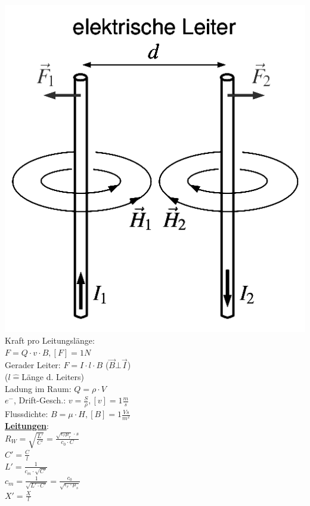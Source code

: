 \documentclass[8pt]{extarticle}
\begin{document}
\begin{minipage}{0.33\textwidth}
\includegraphics[scale=0.14]{mfeld.png}\\
Kraft pro Leitungslänge:\\
\phantom{ss} $F=Q \cdot v \cdot B, [F] = 1N$\\
Gerader Leiter: $F=I \cdot l \cdot B$ {\tiny($\vec{B} \bot \vec{I}$)}\\
\phantom{ss}($l \hat{=}$Länge d. Leiters)\\
Ladung im Raum: $Q = \rho \cdot V$\\
$e^-$, Drift-Gesch.: $v = \frac{S}{\rho}, [v] = 1\frac{m}{s}$\\
Flussdichte: $B=\mu \cdot H, [B] = 1 \frac{Vs}{m^2}$\\
 
\underline{\textbf{Leitungen}}:\\
$R_W = \sqrt{\frac{L'}{C'}} = \frac{\sqrt{\epsilon_r \mu_r} \cdot s}{c_0 \cdot C}$ \\
$C' = \frac{C}{l}$\\
$L' = \frac{1}{c_m \cdot \sqrt{C'}}$\\
$c_m= \frac{1}{\sqrt{L' \cdot C'}} = \frac{c_0}{\sqrt{\epsilon_r \cdot \mu_s}}$\\
$X' = \frac{X}{l}$\\


\end{minipage}
\end{document}
